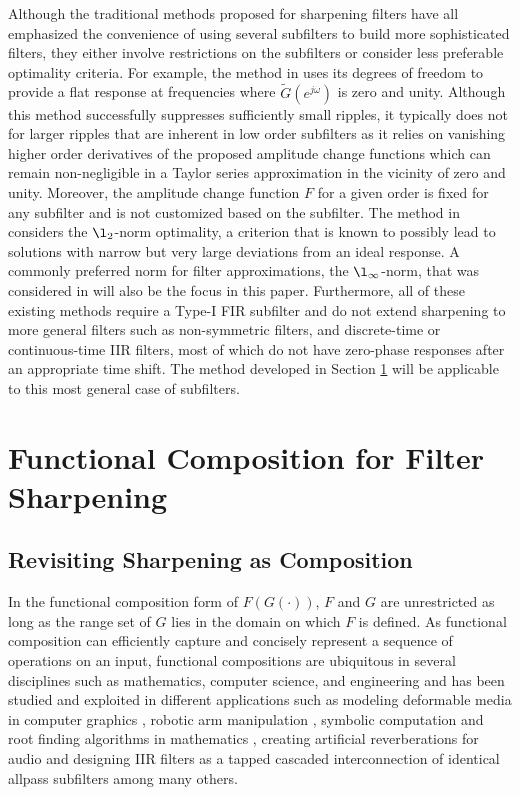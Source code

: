 \documentclass[journal] {IEEEtran}
\begin{document}
Although the traditional methods proposed for sharpening filters have all emphasized the convenience of using several subfilters to build more sophisticated filters, they either involve restrictions on the subfilters or consider less preferable optimality criteria. For example, the method in \cite{Kaiser1977} uses its degrees of freedom to provide a flat response at frequencies where $\tilde{G}(e^{j\omega})$ is zero and unity. Although this method successfully suppresses sufficiently small ripples, it typically does not for larger ripples that are inherent in low order subfilters as it relies on vanishing higher order derivatives of the proposed amplitude change functions which can remain non-negligible in a Taylor series approximation in the vicinity of zero and unity. Moreover, the amplitude change function $F$ for a given order is fixed for any subfilter and is not customized based on the subfilter. The method in \cite{Nakamura} considers the $\l_2$-norm optimality, a criterion that is known to possibly lead to solutions with narrow but very large deviations from an ideal response. A commonly preferred norm for filter approximations, the $\l_{\infty}$-norm, that was considered in \cite{Saramaki} will also be the focus in this paper. Furthermore, all of these existing methods require a Type-I FIR subfilter and do not extend sharpening to more general filters such as non-symmetric filters, and discrete-time or continuous-time IIR filters, most of which do not have zero-phase responses after an appropriate time shift. The method developed in Section \ref{sec:composition} will be applicable to this most general case of subfilters.

\section{Functional Composition for Filter Sharpening}\label{sec:composition}
\subsection{Revisiting Sharpening as Composition}
In the functional composition form of $F(G(\cdot))$, $F$ and $G$ are unrestricted as long as the range set of $G$ lies in the domain on which $F$ is defined. As functional composition can efficiently capture and concisely represent a sequence of operations on an input, functional compositions are ubiquitous in several disciplines such as mathematics, computer science, and engineering and has been studied and exploited in different applications such as modeling deformable media in computer graphics \cite{Sederberg1986}, robotic arm manipulation \cite{Minimair2000, Gathen1995}, symbolic computation and root finding algorithms in mathematics \cite{Barton, Barton1985, Zippel1985}, creating artificial reverberations for audio \cite{Schroeder} and designing IIR filters as a tapped cascaded interconnection of identical allpass subfilters \cite{Saramaki1987} among many others.
\end{document}

